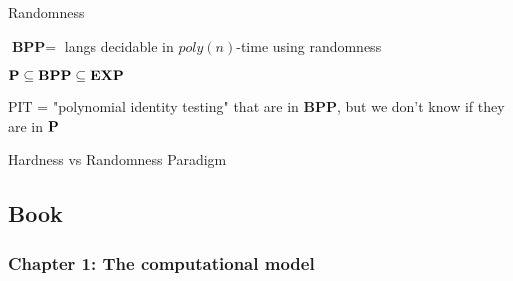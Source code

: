 \documentclass[11pt]{article}
\def \EXP {\textbf{EXP}}
\def \BPP {\textbf{BPP}}
\begin{document}
Randomness

\(\BPP=\) langs decidable in \(poly(n)\)-time using randomness

\(\bP\subseteq\BPP\subseteq\EXP\)

PIT = "polynomial identity testing" that are in \(\BPP\), but we don't know if they are in \(\operatorname{\textbf{P}}\)

Hardness vs Randomness Paradigm

\subsection{Book}
\label{sec:org873d32a}

\subsubsection{Chapter 1: The computational model}
\label{sec:orga69406b}
\end{document}
